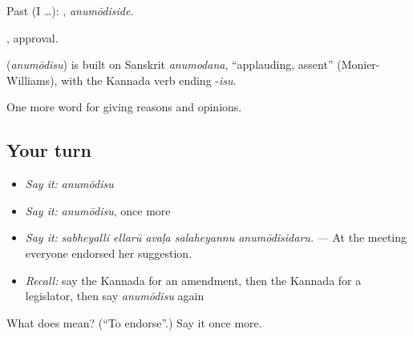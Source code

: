 Past (I …): , \emph{anumōdiside}.

, approval.

\begin{cousinweb}
\textbf{} (\emph{anumōdisu}) is built on Sanskrit \emph{anumodana}, \textquotedblleft{}applauding, assent\textquotedblright{} (Monier-Williams), with the Kannada verb ending -\emph{isu}.
\end{cousinweb}

\begin{grammarlens}[title={What you've built}]
One more word for giving reasons and opinions.
\end{grammarlens}

\subsection*{Your turn}
\begin{itemize}
\raggedright
  \item \emph{Say it:} \emph{anumōdisu}
  \item \emph{Say it:} \emph{anumōdisu}, once more
  \item \emph{Say it:} \emph{sabheyalli ellarū avaḷa salaheyannu anumōdisidaru.} — At the meeting everyone endorsed her suggestion.
  \item \emph{Recall:} say the Kannada for an amendment, then the Kannada for a legislator, then say \emph{anumōdisu} again
\end{itemize}

\begin{tcolorbox}[breakable,colback=teal!4,colframe=teal!35!black,title={Before you move on}]
What does  mean? (\textquotedblleft{}To endorse\textquotedblright{}.) Say it once more.
\end{tcolorbox}
